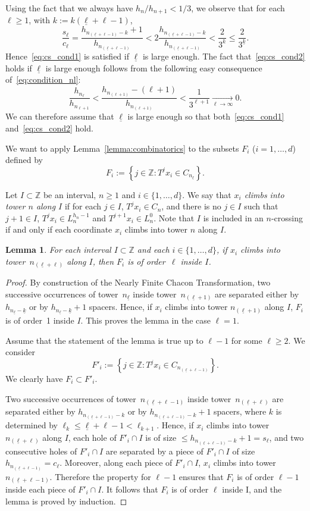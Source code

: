 \documentclass[10pt]{amsart}
\newtheorem{lemm}[theo]{Lemma}\newtheorem{prop}[theo]{Proposition}\newtheorem{coro}[theo]{Corollary}\newtheorem{conj}[theo]{Conjecture}
\theoremstyle{definition}\newtheorem{defi}[theo]{Definition}\newtheorem{rema}[theo]{Remark}\newtheorem{exam}[theo]{Example}\newtheorem{exem}[theo]{Example}\newtheorem{nota}[theo]{Notation}
\newcommand{\egdef}{:=}
\newcommand{\tend}[3][]{\xrightarrow[#2\to#3]{#1}}
\newcommand{\ZZ}{\mathbb{Z}}
\newcommand{\lb}{\underline{\ell}}
\newcommand{\kb}{\underline{k}}
\begin{document}
Using the fact that we always have $h_n/h_{n+1}<1/3$, we observe that for each $\ell\ge1$, with $k\egdef k(\lb+\ell-1)$,
\[
\frac{s_\ell}{c_\ell} = \frac{h_{n_{(\lb+\ell-1)}-k} + 1}{h_{n_{(\lb+\ell-1)}}} < 2 \frac{h_{n_{(\lb+\ell-1)}-k}}{h_{n_{(\lb+\ell-1)}}} < \frac{2}{3^k} \le \frac{2}{3^{\kb}}.
\]
Hence~\eqref{eq:cs_cond1} is satisfied if $\lb$ is large enough. The fact that~\eqref{eq:cs_cond2} holds if $\lb$ is large enough follows from the following easy consequence of~\eqref{eq:condition_nl}:
\[
\frac{h_{n_\ell}}{h_{n_{\ell+1}}} < \frac{ h_{n_{(\ell+1)}}-(\ell+1) }{ h_{n_{(\ell+1)}} } < \frac{1}{3^{\ell+1}} \tend{\ell}{\infty} 0.
\]
We can therefore assume that $\lb$ is large enough so that both~\eqref{eq:cs_cond1} and~\eqref{eq:cs_cond2} hold.

We want to apply Lemma~\ref{lemma:combinatorics} to the subsets $F_i$ ($i=1,\ldots,d$) defined by
\[
F_i \egdef \left\{j\in\ZZ: T^j x_i \in C_{n_{\lb}} \right\}.
\]

Let $I\subset\ZZ$ be an interval, $n\ge1$ and $i\in\{1,\ldots,d\}$. We say that
\emph{$x_i$ climbs into tower $n$ along $I$} if for each $j\in I$, $T^jx_i\in C_n$, and there is no $j\in I$ such that $j+1\in I$, $T^jx_i\in L_n^{h_n-1}$ and $T^{j+1}x_i\in L_n^{0}$. Note that $I$ is included in an $n$-crossing if and only if each coordinate $x_i$ climbs into tower $n$ along $I$.

\begin{lemm}\label{lemma:order}
For each interval $I\subset\ZZ$ and each $i\in\{1,\ldots,d\}$, if $x_i$ climbs into tower~$n_{(\lb+\ell)}$ along $I$, then $F_i$ is of order~$\ell$ inside $I$.
\end{lemm}

\begin{proof}
By construction of the Nearly Finite Chacon Transformation, two successive occurrences of tower~$n_{\lb}$ inside tower~$n_{(\lb+1)}$ are separated either by $h_{n_{\lb}-\kb}$ or by $h_{n_{\lb}-\kb}+1$ spacers. Hence, if $x_i$ climbs into tower $n_{(\lb+1)}$ along $I$, $F_i$ is of order~1 inside $I$. This proves the lemma in the case $\ell=1$.

Assume that the statement of the lemma is true up to $\ell-1$ for some $\ell\ge2$. We consider
\[
F'_i \egdef \left\{j\in\ZZ: T^j x_i \in C_{n_{(\lb+\ell-1)}} \right\}.
\]
We clearly have $F_i\subset F'_i$.

Two successive occurrences of tower~$n_{(\lb+\ell-1)}$ inside tower~$n_{(\lb+\ell)}$ are separated either by $h_{n_{(\lb+\ell-1)}-k}$ or by $h_{n_{(\lb+\ell-1)}-k}+1$ spacers, where $k$ is determined by $\ell_k\le \lb+\ell-1 <\ell_{k+1}$. Hence, if $x_i$ climbs into tower $n_{(\lb+\ell)}$ along $I$, each hole of $F'_i\cap I$ is of size $\le h_{n_{(\lb+\ell-1)}-k}+1=s_\ell$, and two consecutive holes of $F'_i\cap I$ are separated by a piece of $F'_i\cap I$ of size $h_{n_{(\lb+\ell-1)}}=c_\ell$. Moreover, along each piece of $F'_i\cap I$, $x_i$ climbs into tower~$n_{(\lb+\ell-1)}$. Therefore the property for $\ell-1$ ensures that $F_i$ is of order $\ell-1$ inside each piece of $F'_i\cap I$. It follows that $F_i$ is of order $\ell$ inside I, and the lemma is proved by induction.
\end{proof}
\end{document}
